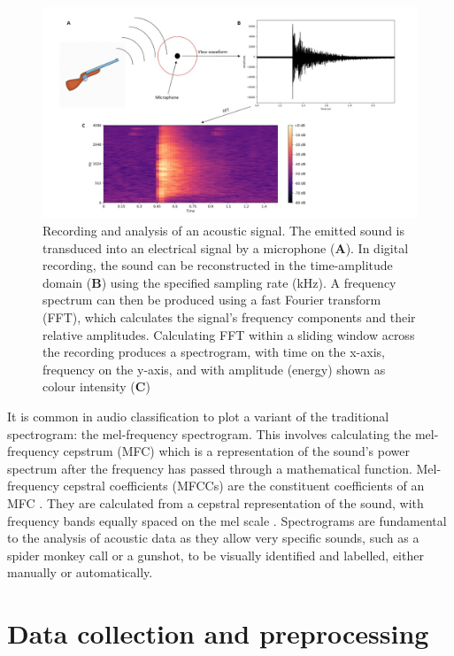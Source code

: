 \begin{figure}
\includegraphics[width=1.2\textwidth,center]{Figures/audio_analysis}\caption[Analysis of acoustic data]{Recording and analysis of an acoustic signal. The emitted sound is transduced into an electrical signal by a microphone (\textbf{A}). In digital recording, the sound can be reconstructed in the time-amplitude domain (\textbf{B}) using the specified sampling rate (kHz). A frequency spectrum can then be produced using a fast Fourier transform (FFT), which calculates the signal’s frequency components and their relative amplitudes. Calculating FFT within a sliding window across the recording produces a spectrogram, with time on the x-axis, frequency on the y-axis, and with amplitude (energy) shown as colour intensity (\textbf{C})}\label{fig:audio_analysis}
\end{figure}

\noindent It is common in audio classification to plot a variant of the traditional spectrogram: the mel-frequency spectrogram. This involves calculating the mel-frequency cepstrum (MFC) which is a representation of the sound's power spectrum after the frequency has passed through a mathematical function. Mel-frequency cepstral coefficients (MFCCs) are the constituent coefficients of an MFC \citep{Xu2004}. They are calculated from a cepstral representation of the sound, with frequency bands equally spaced on the mel scale \citep{Stevens1937}. Spectrograms are fundamental to the analysis of acoustic data as they allow very specific sounds, such as a spider monkey call or a gunshot, to be visually identified and labelled, either manually or automatically.

\section{Data collection and preprocessing}



